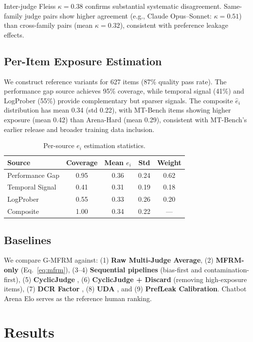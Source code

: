 \documentclass[letterpaper,11pt]{article}
\begin{document}
Inter-judge Fleiss $\kappa = 0.38$ confirms substantial systematic disagreement. Same-family judge pairs show higher agreement (e.g., Claude Opus--Sonnet: $\kappa = 0.51$) than cross-family pairs (mean $\kappa = 0.32$), consistent with preference leakage effects.

\subsection{Per-Item Exposure Estimation}

We construct reference variants for 627 items (87\% quality pass rate). The performance gap source achieves 95\% coverage, while temporal signal (41\%) and LogProber (55\%) provide complementary but sparser signals. The composite $\hat{e}_i$ distribution has mean 0.34 (std 0.22), with MT-Bench items showing higher exposure (mean 0.42) than Arena-Hard (mean 0.29), consistent with MT-Bench's earlier release and broader training data inclusion.

\begin{table}[t]
\centering
\caption{Per-source $e_i$ estimation statistics.}
\label{tab:ei_sources}
\small
\begin{tabular}{lcccc}
\toprule
Source & Coverage & Mean $e_i$ & Std & Weight \\
\midrule
Performance Gap & 0.95 & 0.36 & 0.24 & 0.62 \\
Temporal Signal & 0.41 & 0.31 & 0.19 & 0.18 \\
LogProber & 0.55 & 0.33 & 0.26 & 0.20 \\
Composite & 1.00 & 0.34 & 0.22 & --- \\
\bottomrule
\end{tabular}
\end{table}

\subsection{Baselines}

We compare G-MFRM against: (1) \textbf{Raw Multi-Judge Average}, (2) \textbf{MFRM-only} (Eq.~\ref{eq:mfrm}), (3--4) \textbf{Sequential pipelines} (bias-first and contamination-first), (5) \textbf{CyclicJudge} \citep{li2024cyclicjudge}, (6) \textbf{CyclicJudge + Discard} (removing high-exposure items), (7) \textbf{DCR Factor} \citep{dekoninck2024dcr}, (8) \textbf{UDA} \citep{son2024uda}, and (9) \textbf{PrefLeak Calibration}. Chatbot Arena Elo serves as the reference human ranking.

\section{Results}
\label{sec:results}
\end{document}
